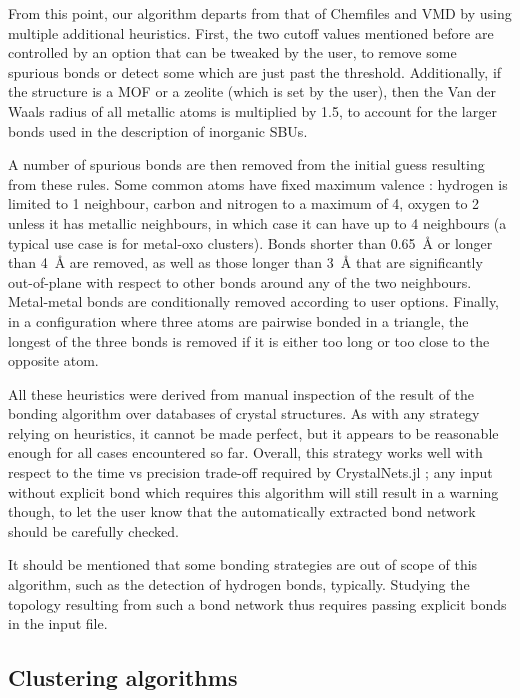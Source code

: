 \documentclass[main.tex]{subfiles}
\begin{document}
From this point, our algorithm departs from that of Chemfiles and VMD by using multiple additional heuristics. First, the two cutoff values mentioned before are controlled by an option that can be tweaked by the user, to remove some spurious bonds or detect some which are just past the threshold. Additionally, if the structure is a MOF or a zeolite (which is set by the user), then the Van der Waals radius of all metallic atoms is multiplied by 1.5, to account for the larger bonds used in the description of inorganic SBUs.

A number of spurious bonds are then removed from the initial guess resulting from these rules. Some common atoms have fixed maximum valence : hydrogen is limited to 1 neighbour, carbon and nitrogen to a maximum of 4, oxygen to 2 unless it has metallic neighbours, in which case it can have up to 4 neighbours (a typical use case is for metal-oxo clusters). Bonds shorter than \qty{0.65}{\angstrom} or longer than \qty{4}{\angstrom} are removed, as well as those longer than \qty{3}{\angstrom} that are significantly out-of-plane with respect to other bonds around any of the two neighbours. Metal-metal bonds are conditionally removed according to user options. Finally, in a configuration where three atoms are pairwise bonded in a triangle, the longest of the three bonds is removed if it is either too long or too close to the opposite atom.

All these heuristics were derived from manual inspection of the result of the bonding algorithm over databases of crystal structures. As with any strategy relying on heuristics, it cannot be made perfect, but it appears to be reasonable enough for all cases encountered so far. Overall, this strategy works well with respect to the time vs precision trade-off required by CrystalNets.jl ; any input without explicit bond which requires this algorithm will still result in a warning though, to let the user know that the automatically extracted bond network should be carefully checked.

It should be mentioned that some bonding strategies are out of scope of this algorithm, such as the detection of hydrogen bonds, typically. Studying the topology resulting from such a bond network thus requires passing explicit bonds in the input file.



\subsection{Clustering algorithms}
\label{clusteringalgorithms}
\end{document}
